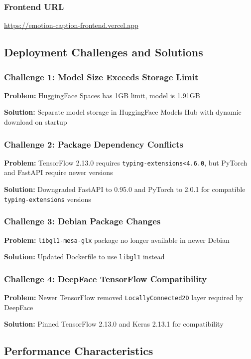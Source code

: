 \documentclass[12pt]{article}
\begin{document}
\subsubsection{Frontend URL}
\begin{center}
\Large
\url{https://emotion-caption-frontend.vercel.app}
\end{center}

\subsection{Deployment Challenges and Solutions}

\subsubsection{Challenge 1: Model Size Exceeds Storage Limit}
\textbf{Problem:} HuggingFace Spaces has 1GB limit, model is 1.91GB

\textbf{Solution:} Separate model storage in HuggingFace Models Hub with dynamic download on startup

\subsubsection{Challenge 2: Package Dependency Conflicts}
\textbf{Problem:} TensorFlow 2.13.0 requires \texttt{typing-extensions<4.6.0}, but PyTorch and FastAPI require newer versions

\textbf{Solution:} Downgraded FastAPI to 0.95.0 and PyTorch to 2.0.1 for compatible \texttt{typing-extensions} versions

\subsubsection{Challenge 3: Debian Package Changes}
\textbf{Problem:} \texttt{libgl1-mesa-glx} package no longer available in newer Debian

\textbf{Solution:} Updated Dockerfile to use \texttt{libgl1} instead

\subsubsection{Challenge 4: DeepFace TensorFlow Compatibility}
\textbf{Problem:} Newer TensorFlow removed \texttt{LocallyConnected2D} layer required by DeepFace

\textbf{Solution:} Pinned TensorFlow 2.13.0 and Keras 2.13.1 for compatibility

\subsection{Performance Characteristics}
\end{document}
